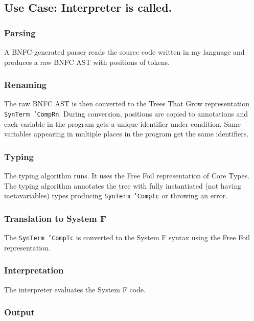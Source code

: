 \newpage

\subsection{Use Case: Interpreter is called.}

\subsubsection{Parsing}

A BNFC-generated parser reads the source code written in my language and produces a raw BNFC AST with positions of tokens.

\subsubsection{Renaming}

The raw BNFC AST is then converted to the Trees That Grow representation \texttt{SynTerm 'CompRn}.
During conversion, positions are copied to annotations and each variable in the program gets a unique identifier under condition.
Same variables appearing in multiple places in the program get the same identifiers.

\subsubsection{Typing}

The typing algorithm runs.
It uses the Free Foil representation of Core Types.
The typing algorithm annotates the tree with fully instantiated (not having metavariables) types producing \texttt{SynTerm 'CompTc} or throwing an error.

\subsubsection{Translation to System F}

The \texttt{SynTerm 'CompTc} is converted to the System F syntax using the Free Foil representation.

\subsubsection{Interpretation}

The interpreter evaluates the System F code.

\subsubsection{Output}

